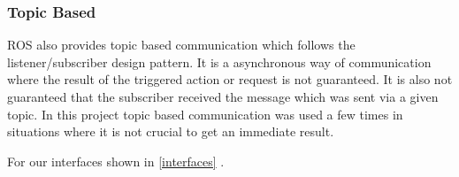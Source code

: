 \documentclass[main.tex]{subfiles}
\begin{document}
			\subsubsection{Topic Based}
			
			ROS also provides topic based communication which follows the listener/subscriber design pattern. It is a asynchronous way of communication where the result of the triggered action or request is not guaranteed. It is also not guaranteed that the subscriber received the message which was sent via a given topic. In this project topic based communication was used a few times in situations where it is not crucial to get an immediate result.  
		

		For our interfaces shown in \ref{interfaces} . 


	\endgroup
\end{document}
